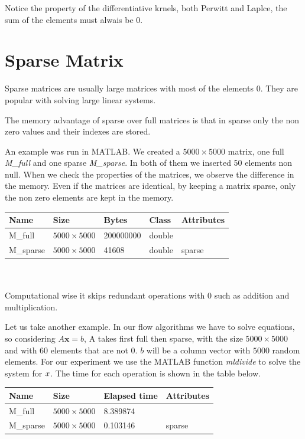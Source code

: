 \documentclass[12pt,a4paper,twoside]{report}
\begin{document}
{Notice the property of the differentiative krnels, both Perwitt and Laplce, the sum of the elements must alwais be 0. 

\section{Sparse Matrix}

Sparse matrices are usually large matrices with most of the elements $0$. They are popular with solving large linear systems.

The memory advantage of sparse over full matrices is that in sparse only the non zero values and their indexes are stored. 

An example was run in MATLAB. We created a  $5000\times5000$ matrix, one full\textit{ M\_full }and one sparse \textit{M\_sparse}. In both of them we inserted 50 elements non null. When we check the properties of the matrices, we observe the difference in the memory.
Even if the matrices are identical, by keeping a matrix sparse, only the non zero elements are kept in the memory. 
\\

\begin{tabular}{ l l l l l }
	\hline
		Name  &           Size  &                Bytes & Class   &  Attributes \\
	\hline
M\_full    &    $5000\times5000$      &      200000000 & double  &            \\
M\_sparse  &    $5000\times5000$       &         41608  & double &   sparse    

\end{tabular}
\\
\\


Computational wise it skips redundant operations with 0 such as addition and multiplication.

Let us take another example. In our flow algorithms we have to solve equations, so considering $A\boldsymbol{x} = b$, A takes first full then sparse, with the size $5000\times5000$ and with 60 elements that are not $0$. $b$ will be a column vector with $5000$ random elements. For our experiment we use the MATLAB function \textit{mldivide} to solve the system for $\boldmath{x}$. The time for each operation is shown in the table below.
\\

\begin{tabular}{ l l  l l }
	\hline
	Name  &           Size  &                Elapsed time   &  Attributes \\
	\hline
	M\_full    &    $5000\times5000$      &      8.389874   &            \\
	M\_sparse  &    $5000\times5000$       &         0.103146   &   sparse    
	

\end{tabular}}
\end{document}
